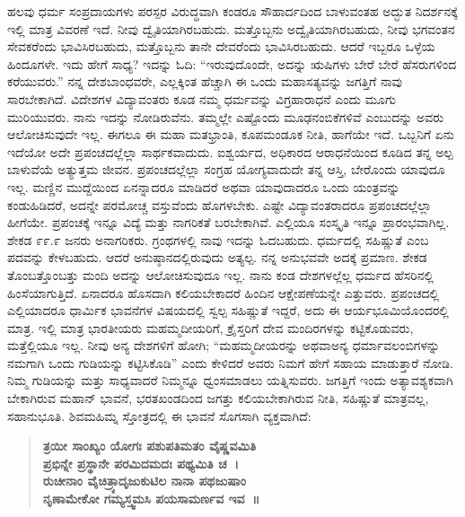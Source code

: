 ಹಲವು ಧರ್ಮ ಸಂಪ್ರದಾಯಗಳು ಪರಸ್ಪರ ವಿರುದ್ಧವಾಗಿ ಕಂಡರೂ ಸೌಹಾರ್ದದಿಂದ ಬಾಳುವಂತಹ ಅದ್ಭುತ ನಿದರ್ಶನಕ್ಕೆ ಇಲ್ಲಿ ಮಾತ್ರ ವಿವರಣೆ ಇದೆ. ನೀವು ದ್ವೈತಿಯಾಗಿರಬಹುದು. ಮತ್ತೊಬ್ಬನು ಅದ್ವೈತಿಯಾಗಿರಬಹುದು, ನೀವು ಭಗವಂತನ ಸೇವಕರೆಂದು ಭಾವಿಸಿರಬಹುದು, ಮತ್ತೊಬ್ಬನು ತಾನೇ ದೇವರೆಂದು ಭಾವಿಸಿರಬಹುದು. ಆದರೆ ಇಬ್ಬರೂ ಒಳ್ಳೆಯ ಹಿಂದೂಗಳೇ. ಇದು ಹೇಗೆ ಸಾಧ್ಯ? ಇದನ್ನು ಓದಿ: “ಇರುವುದೊಂದೇ, ಅದನ್ನು ಋಷಿಗಳು ಬೇರೆ ಬೇರೆ ಹೆಸರುಗಳಿಂದ ಕರೆಯುವರು.” ನನ್ನ ದೇಶಬಾಂಧವರೇ, ಎಲ್ಲಕ್ಕಿಂತ ಹೆಚ್ಚಾಗಿ ಈ ಒಂದು ಮಹಾಸತ್ಯವನ್ನು ಜಗತ್ತಿಗೆ ನಾವು ಸಾರಬೇಕಾಗಿದೆ. ವಿದೇಶಗಳ ವಿದ್ಯಾವಂತರು ಕೂಡ ನಮ್ಮ ಧರ್ಮವನ್ನು ವಿಗ್ರಹಾರಾಧನೆ ಎಂದು ಮೂಗು ಮುರಿಯುವರು. ನಾನು ಇದನ್ನು ನೋಡಿರುವೆನು. ತಮ್ಮಲ್ಲೇ ಎಷ್ಟೊಂದು ಮೂಢನಂಬಿಕೆಗಳಿವೆ ಎಂಬುದನ್ನು ಅವರು ಆಲೋಚಿಸುವುದೇ ಇಲ್ಲ. ಈಗಲೂ ಈ ಮಹಾ ಮತಭ್ರಾಂತಿ, ಕೂಪಮಂಡೂಕ ನೀತಿ, ಹಾಗೆಯೇ ಇದೆ. ಒಬ್ಬನಿಗೆ ಏನು ಇದೆಯೋ ಅದೇ ಪ್ರಪಂಚದಲ್ಲೆಲ್ಲಾ ಸಾರ್ಥಕವಾದುದು. ಐಶ್ವರ್ಯದ, ಅಧಿಕಾರದ ಆರಾಧನೆಯಿಂದ ಕೂಡಿದ ತನ್ನ ಅಲ್ಪ ಬಾಳುವೆಯೆ ಅತ್ಯುತ್ತಮ ಜೀವನ. ಪ್ರಪಂಚದಲ್ಲೆಲ್ಲಾ ಸಂಗ್ರಹ ಯೋಗ್ಯವಾದುದೇ ತನ್ನ ಆಸ್ತಿ, ಬೇರೊಂದು ಯಾವುದೂ ಇಲ್ಲ. ಮಣ್ಣಿನ ಮುದ್ದೆಯಿಂದ ಏನನ್ನಾದರೂ ಮಾಡಿದರೆ ಅಥವಾ ಯಾವುದಾದರೂ ಒಂದು ಯಂತ್ರವನ್ನು ಕಂಡುಹಿಡಿದರೆ, ಅದನ್ನೇ ಪರಮೋಚ್ಚ ವಸ್ತುವೆಂದು ಹೊಗಳಬೇಕು. ಎಷ್ಟೇ ವಿದ್ಯಾವಂತರಾದರೂ ಪ್ರಪಂಚದಲ್ಲೆಲ್ಲಾ ಹೀಗೆಯೇ. ಪ್ರಪಂಚಕ್ಕೆ ಇನ್ನೂ ವಿದ್ಯೆ ಮತ್ತು ನಾಗರಿಕತೆ ಬರಬೇಕಾಗಿವೆ. ಎಲ್ಲಿಯೂ ಸಂಸ್ಕೃತಿ ಇನ್ನೂ ಪ್ರಾರಂಭವಾಗಿಲ್ಲ. ಶೇಕಡ ೯೯.೯ ಜನರು ಅನಾಗರಿಕರು. ಗ್ರಂಥಗಳಲ್ಲಿ ನಾವು ಇದನ್ನು ಓದಬಹುದು. ಧರ್ಮದಲ್ಲಿ ಸಹಿಷ್ಣುತೆ ಎಂಬ ಪದವನ್ನು ಕೇಳಬಹುದು. ಆದರೆ ಅನುಷ್ಠಾನದಲ್ಲಿರುವುದು ಅತ್ಯಲ್ಪ. ನನ್ನ ಅನುಭವವೇ ಅದಕ್ಕೆ ಪ್ರಮಾಣ. ಶೇಕಡ ತೊಂಬತ್ತೊಂಬತ್ತು ಮಂದಿ ಅದನ್ನು ಆಲೋಚಿಸುವುದೂ ಇಲ್ಲ. ನಾನು ಕಂಡ ದೇಶಗಳಲ್ಲೆಲ್ಲ ಧರ್ಮದ ಹೆಸರಿನಲ್ಲಿ ಹಿಂಸೆಯಾಗುತ್ತಿದೆ. ಏನಾದರೂ ಹೊಸದಾಗಿ ಕಲಿಯಬೇಕಾದರೆ ಹಿಂದಿನ ಆಕ್ಷೇಪಣೆಯನ್ನೇ ಎತ್ತುವರು. ಪ್ರಪಂಚದಲ್ಲಿ ಎಲ್ಲಿಯಾದರೂ ಧಾರ್ಮಿಕ ಭಾವನೆಗಳ ವಿಷಯದಲ್ಲಿ ಸ್ವಲ್ಪ ಸಹಿಷ್ಣುತೆ ಇದ್ದರೆ, ಅದು ಈ ಆರ್ಯಭೂಮಿಯೊಂದರಲ್ಲಿ ಮಾತ್ರ. ಇಲ್ಲಿ ಮಾತ್ರ ಭಾರತೀಯರು ಮಹಮ್ಮದೀಯರಿಗೆ, ಕ್ರೈಸ್ತರಿಗೆ ದೇವ ಮಂದಿರಗಳನ್ನು ಕಟ್ಟಿಕೊಡುವರು, ಮತ್ತೆಲ್ಲಿಯೂ ಇಲ್ಲ. ನೀವು ಅನ್ಯ ದೇಶಗಳಿಗೆ ಹೋಗಿ; “ಮಹಮ್ಮದೀಯರನ್ನು ಅಥವಾ\break ಅನ್ಯ ಧರ್ಮಾವಲಂಬಿಗಳನ್ನು ನಮಗಾಗಿ ಒಂದು ಗುಡಿಯನ್ನು ಕಟ್ಟಿಸಿಕೊಡಿ” ಎಂದು ಕೇಳಿದರೆ ಅವರು ನಿಮಗೆ ಹೇಗೆ ಸಹಾಯ ಮಾಡುತ್ತಾರೆ ನೋಡಿ. ನಿಮ್ಮ ಗುಡಿಯನ್ನು ಮತ್ತು ಸಾಧ್ಯವಾದರೆ ನಿಮ್ಮನ್ನೂ ಧ್ವಂಸಮಾಡಲು ಯತ್ನಿಸುವರು. ಜಗತ್ತಿಗೆ ಇಂದು ಅತ್ಯಾವಶ್ಯಕವಾಗಿ ಬೇಕಾಗಿರುವ ಮಹಾನ್ ಭಾವನೆ, ಭರತಖಂಡದಿಂದ ಜಗತ್ತು ಕಲಿಯಬೇಕಾಗಿರುವ ನೀತಿ, ಸಹಿಷ್ಣುತೆ ಮಾತ್ರವಲ್ಲ, ಸಹಾನುಭೂತಿ. ಶಿವಮಹಿಮ್ನ ಸ್ತೋತ್ರದಲ್ಲಿ ಈ ಭಾವನೆ ಸೊಗಸಾಗಿ ವ್ಯಕ್ತವಾಗಿದೆ:

\begin{verse}
\textbf{ತ್ರಯೀ ಸಾಂಖ್ಯಂ ಯೋಗಃ ಪಶುಪತಿಮತಂ ವೈಷ್ಣವಮಿತಿ}\\\textbf{ಪ್ರಭಿನ್ನೇ ಪ್ರಸ್ಥಾನೇ ಪರಮಿದಮದಃ ಪಥ್ಯಮಿತಿ ಚ~।}\\\textbf{ರುಚೀನಾಂ ವೈಚಿತ್ರ್ಯಾದೃಜುಕುಟಿಲ ನಾನಾ ಪಥಜುಷಾಂ}\\\textbf{ನೃಣಾಮೇಕೋ ಗಮ್ಯಸ್ತ್ವಮಸಿ ಪಯಸಾಮರ್ಣವ ಇವ~॥}
\end{verse}

